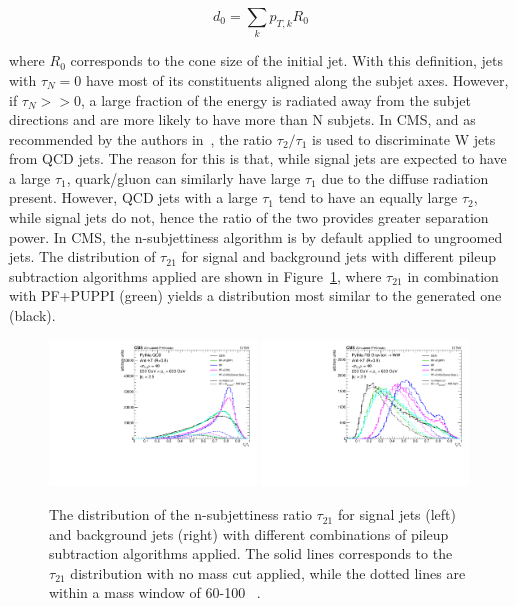  \begin{equation}
d_0 = \sum_k p_{T,k} R_0
 \end{equation} 

where $R_0$ corresponds to the cone size of the initial jet. With this definition, jets with $\tau_N=0$ have most of its constituents aligned along the subjet axes. However, if $\tau_N>>0$, a large fraction of the energy is radiated away from the subjet directions and are more likely to have more than N subjets.
In CMS, and as recommended by the authors in~\cite{Thaler:2010tr}, the ratio $\tau_2/\tau_1$ is used to discriminate W jets from QCD jets. The reason for this is that, while 
signal jets are expected to have a large $\tau_1$, quark/gluon can similarly have large $\tau_1$ due to the diffuse radiation present. However, QCD jets with a large $\tau_1$ tend to have an equally large $\tau_2$, while signal jets do not, hence the ratio of the two provides greater separation power. In CMS, the n-subjettiness algorithm is by default applied to ungroomed jets.
The distribution of $\tau_{21}$ for signal and background jets with different pileup subtraction algorithms applied are shown in Figure~\ref{fig:objreco:tau21}, where $\tau_21$ in combination with PF+PUPPI (green) yields a distribution most similar to the generated one (black).

\begin{figure}[ht] 
    \centering 
    \includegraphics[width=0.490\textwidth]{figures/event_reconstruction/sig_tau21.pdf}
    \includegraphics[width=0.490\textwidth]{figures/event_reconstruction/bkg_tau21.pdf}
     \caption{The distribution of the n-subjettiness ratio $\tau_{21}$ for signal jets (left) and background jets (right) with different combinations of pileup subtraction algorithms applied. The solid lines corresponds to the $\tau_{21}$ distribution with no mass cut applied, while the dotted lines are within a mass window of 60-100 \GeV~\cite{CMS-PAS-JME-14-001}.}
     \label{fig:objreco:tau21}
 \end{figure}


